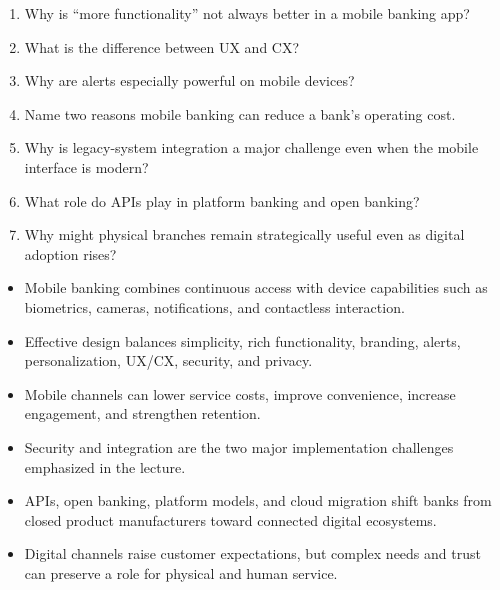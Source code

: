 \begin{quickcheck}
\begin{enumerate}
  \item Why is ``more functionality'' not always better in a mobile banking app?
  \item What is the difference between UX and CX?
  \item Why are alerts especially powerful on mobile devices?
  \item Name two reasons mobile banking can reduce a bank's operating cost.
  \item Why is legacy-system integration a major challenge even when the mobile interface is modern?
  \item What role do APIs play in platform banking and open banking?
  \item Why might physical branches remain strategically useful even as digital adoption rises?
\end{enumerate}
\end{quickcheck}

\begin{chapterrecap}
\begin{itemize}
  \item Mobile banking combines continuous access with device capabilities such as biometrics, cameras, notifications, and contactless interaction.
  \item Effective design balances simplicity, rich functionality, branding, alerts, personalization, UX/CX, security, and privacy.
  \item Mobile channels can lower service costs, improve convenience, increase engagement, and strengthen retention.
  \item Security and integration are the two major implementation challenges emphasized in the lecture.
  \item APIs, open banking, platform models, and cloud migration shift banks from closed product manufacturers toward connected digital ecosystems.
  \item Digital channels raise customer expectations, but complex needs and trust can preserve a role for physical and human service.
\end{itemize}
\end{chapterrecap}
